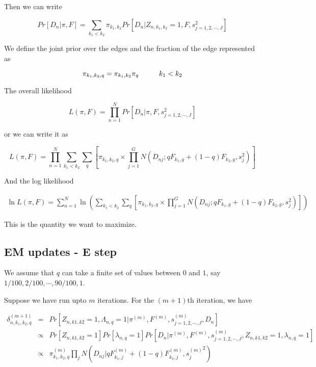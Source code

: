 \documentclass[12pt]{article}
\begin{document}
Then we can write 


 $$ Pr \left [ D_{n} | \pi, F \right ] = \sum_{k_1 < k_2} \pi_{k_1, k_2} Pr \left [ D_{n} | Z_{n, k_1, k_2}=1, F, s^2_{j=1,2,\cdots,J} \right ] $$
 
We define the joint prior over the edges and the fraction of the edge represented as 

$$ \pi_{k_1,k_2, q} = \pi_{k_1, k_2} \pi_{q} \hspace{1 cm} k_1 < k_2 $$

The overall likelihood 

$$ L(\pi, F) = \prod_{n=1}^{N} Pr \left [ D_{n} | \pi, F, s^2_{j=1,2,\cdots,J} \right ] $$

or we can write it as 

$$L(\pi, F) = \prod_{n=1}^{N} \sum_{k_1 < k_2} \sum_{q} \left [ \pi_{k_1,k_2, q} \times \prod_{j=1}^{G} N \left (D_{nj}; q F_{k_1,g} + (1-q) F_{k_2, g}, s^2_{j} \right) \right ]  $$

And the log likelihood

\begin{eqnarray}
\ln {L (\pi, F)} = \sum_{n=1}^{N} \ln \left (\sum_{k_1 < k_2} \sum_{q} \left [ \pi_{k_1,k_2, q} \times \prod_{j=1}^{G} N \left (D_{nj}; q F_{k_1,g} + (1-q) F_{k_2, g}, s^2_{j} \right) \right ] \right )
\end{eqnarray}

This is the quantity we want to maximize. 

\subsection{EM updates - E step}

We assume that $q$ can take a finite set of values between $0$ and $1$, 
say $1/100, 2/100, \cdots, 90/100, 1$.

Suppose we have run upto $m$ iterations. For the $(m+1)$th iteration, we have 

\begin{eqnarray} \nonumber
\delta^{(m+1)}_{n, k_1, k_2, q} &=& Pr \left [ Z_{n, k1, k2} = 1, \Lambda_{n,q} = 1 | \pi^{(m)}, F^{(m)}, s^{(m)}_{j=1,2,\cdots,J}, D_{n} \right ] \\ \nonumber
 &\propto& Pr \left [ Z_{n, k1, k2} = 1 \right] Pr \left [ \lambda_{n,q} = 1 \right] Pr \left [ D_{n} | \pi^{(m)}, F^{(m)}, s^{(m)}_{j=1,2,\cdots,J}, Z_{n, k1, k2}= 1, \lambda_{n, q}=1 \right] \\ \nonumber
 &\propto& \pi^{(m)}_{k_1,k_2, q} \prod_{j} N \left (D_{nj} | qF^{(m)}_{k_1,j} + (1-q)F^{(m)}_{k_2,j}, {s_j^{(m)}}^2 \right) \\ \nonumber
\end{eqnarray}
\end{document}
